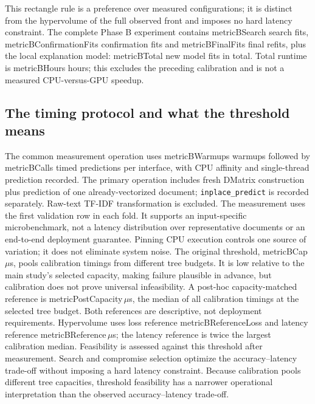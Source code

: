 \documentclass[12pt,a4paper]{article}
\newcommand{\m}[1]{\csname metric#1\endcsname}
\begin{document}
This rectangle rule is a preference over measured configurations; it is distinct from the hypervolume of the full observed front and imposes no hard latency constraint.
The complete Phase B experiment contains \m{BSearch} search fits, \m{BConfirmationFits} confirmation fits and \m{BFinalFits} final refits, plus the local explanation model: \m{BTotal} new model fits in total. Total runtime is \m{BHours} hours; this excludes the preceding calibration and is not a measured CPU-versus-GPU speedup.
\begin{table}[!htbp]\centering
\caption{Phase B fit allocation per method and search repeat, including all development folds. Sequential CCD reallocates center replication to adaptive points while preserving the total budget. TPE's proposals are reported as search fits.}\end{table}
\subsection{The timing protocol and what the threshold means}
The common measurement operation uses \m{BWarmups} warmups followed by \m{BCalls} timed predictions per interface, with CPU affinity and single-thread prediction recorded. The primary operation includes fresh DMatrix construction plus prediction of one already-vectorized document; \texttt{inplace\_predict} is recorded separately. Raw-text TF-IDF transformation is excluded.
The measurement uses the first validation row in each fold. It supports an input-specific microbenchmark, not a latency distribution over representative documents or an end-to-end deployment guarantee. Pinning CPU execution controls one source of variation; it does not eliminate system noise.
The original threshold, \m{BCap}\,$\mu$s, pools calibration timings from different tree budgets. It is low relative to the main study's selected capacity, making failure plausible in advance, but calibration does not prove universal infeasibility. A post-hoc capacity-matched reference is \m{PostCapacity}\,$\mu$s, the median of all calibration timings at the selected tree budget. Both references are descriptive, not deployment requirements. Hypervolume uses loss reference \m{BReferenceLoss} and latency reference \m{BReference}\,$\mu$s; the latency reference is twice the largest calibration median.
Feasibility is assessed against this threshold after measurement. Search and compromise selection optimize the accuracy--latency trade-off without imposing a hard latency constraint. Because calibration pools different tree capacities, threshold feasibility has a narrower operational interpretation than the observed accuracy--latency trade-off.
\end{document}
